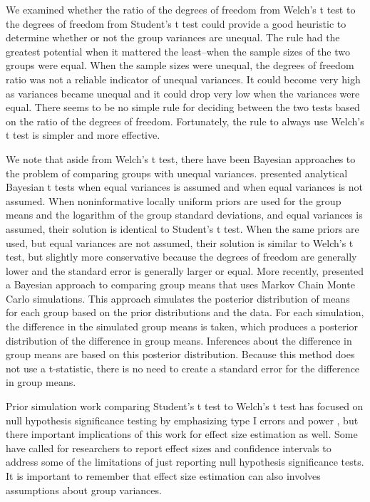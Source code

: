 \documentclass[man,a4paper,noextraspace,apacite]{apa6}
\begin{document}
    We examined whether the ratio of the degrees of freedom from Welch's t test to the degrees of freedom from Student's t test could provide a good heuristic to determine whether or not the group variances are unequal. The rule had the greatest potential when it mattered the least--when the sample sizes of the two groups were equal. When the sample sizes were unequal, the degrees of freedom ratio was not a reliable indicator of unequal variances. It could become very high as variances became unequal and it could drop very low when the variances were equal. There seems to be no simple rule for deciding between the two tests based on the ratio of the degrees of freedom. Fortunately, the rule to always use Welch's t test is simpler and more effective.
    
    We note that aside from Welch's t test, there have been Bayesian approaches to the problem of comparing groups with unequal variances.  presented analytical Bayesian t tests when equal variances is assumed and when equal variances is not assumed. When noninformative locally uniform priors are used for the group means and the logarithm of the group standard deviations, and equal variances is assumed, their solution is identical to Student's t test. When the same priors are used, but equal variances are not assumed, their solution is similar to Welch's t test, but slightly more conservative because the degrees of freedom are generally lower and the standard error is generally larger or equal. More recently,  presented a Bayesian approach to comparing group means that uses Markov Chain Monte Carlo simulations. This approach simulates the posterior distribution of means for each group based on the prior distributions and the data. For each simulation, the difference in the simulated group means is taken, which produces a posterior distribution of the difference in group means. Inferences about the difference in group means are based on this posterior distribution. Because this method does not use a t-statistic, there is no need to create a standard error for the difference in group means. 
    
    Prior simulation work comparing Student's t test to Welch's t test has focused on null hypothesis significance testing by emphasizing type I errors and power \cite{Boneau1960, Neuhauser2002, Zimmerman1993, Zimmerman2004, Zimmerman1996, Zimmerman2009}, but there important implications of this work for effect size estimation as well. Some have called for researchers to report effect sizes and confidence intervals to address some of the limitations of just reporting null hypothesis significance tests. It is important to remember that effect size estimation can also involves assumptions about group variances.
    
\end{document}

